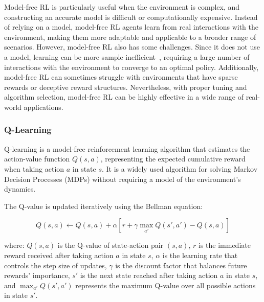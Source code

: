 Model-free RL is particularly useful when the environment is complex, and constructing an accurate model is difficult or computationally expensive.
Instead of relying on a model, model-free RL agents learn from real interactions with the environment, making them more adaptable and applicable to a broader range of scenarios.
However, model-free RL also has some challenges.
Since it does not use a model, learning can be more sample inefficient~\cite{sutton2018reinforcement}, requiring a large number of interactions with the environment to converge to an optimal policy. Additionally, model-free RL can sometimes struggle with environments that have sparse rewards or deceptive reward structures. Nevertheless, with proper tuning and algorithm selection, model-free RL can be highly effective in a wide range of real-world applications.
\subsubsection{Q-Learning}\label{subsubsec:q-learning}

Q-learning is a model-free reinforcement learning algorithm that estimates the action-value function \(Q(s, a)\), representing the expected cumulative reward when taking action \(a\) in state \(s\). It is a widely used algorithm for solving Markov Decision Processes (MDPs) without requiring a model of the environment's dynamics.

The Q-value is updated iteratively using the Bellman equation:

\[Q(s, a) \leftarrow Q(s, a) + \alpha \left[ r + \gamma \max_{a'} Q(s', a') - Q(s, a) \right]\]

where:
\(Q(s, a)\) is the Q-value of state-action pair \((s, a)\),
\(r\) is the immediate reward received after taking action \(a\) in state \(s\),
\(\alpha\) is the learning rate that controls the step size of updates,
\(\gamma\) is the discount factor that balances future rewards' importance,
\(s'\) is the next state reached after taking action \(a\) in state \(s\), and
\(\max_{a'} Q(s', a')\) represents the maximum Q-value over all possible actions in state \(s'\).

